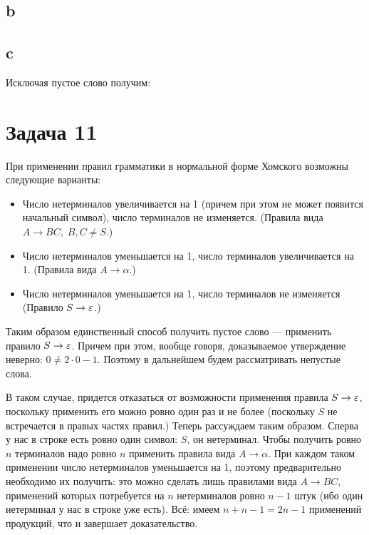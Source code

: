 \documentclass[12pt]{article}
\begin{document}
\subsection{b}
\subsection{c}
Исключая пустое слово получим:

\section{Задача 11}
При применении правил грамматики в нормальной форме Хомского возможны следующие варианты:
\begin{itemize}
    \item Число нетерминалов увеличивается на 1 (причем при этом не может появится начальный символ), число терминалов не изменяется. (Правила вида $A\to BC,\;B,C\ne S$.)
    \item Число нетерминалов уменьшается на 1, число терминалов увеличивается на 1. (Правила вида $A\to \alpha$.)
    \item Число нетерминалов уменьшается на 1, число терминалов не изменяется (Правило $S\to\varepsilon$.)
\end{itemize}
Таким образом единственный способ получить пустое слово --- применить правило $S\to\varepsilon$. Причем при этом, вообще говоря, доказываемое утверждение неверно: $0\ne 2\cdot 0 - 1$. Поэтому в дальнейшем будем рассматривать непустые слова.

В таком случае, придется отказаться от возможности применения правила $S\to\varepsilon$, поскольку применить его можно ровно один раз и не более (поскольку $S$ не встречается в правых частях правил.) Теперь рассуждаем таким образом. Сперва у нас в строке есть ровно один символ: $S$, он нетерминал. Чтобы получить ровно $n$ терминалов надо ровно $n$ применить правила вида $A\to\alpha$. При каждом таком применении число нетерминалов уменьшается на 1, поэтому предварительно необходимо их получить: это можно сделать лишь правилами  вида $A\to BC$, применений которых потребуется на $n$ нетерминалов ровно $n-1$ штук (ибо один нетерминал у нас в строке уже есть). Всё: имеем $n+n-1=2n-1$ применений продукций, что и завершает доказательство.
\end{document}
